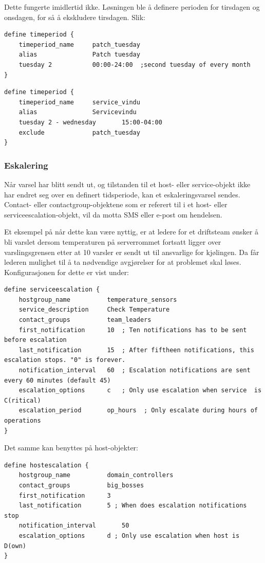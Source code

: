 Dette fungerte imidlertid ikke. Løsningen ble å definere perioden for tirsdagen og onsdagen, for så å ekskludere tirsdagen. Slik:
\begin{lstlisting}[style=example]
define timeperiod {
    timeperiod_name 	patch_tuesday
    alias           	Patch tuesday
    tuesday 2          	00:00-24:00  ;second tuesday of every month
}
\end{lstlisting}

\begin{lstlisting}[style=example]
define timeperiod {
    timeperiod_name     service_vindu
    alias				Servicevindu
    tuesday 2 - wednesday   	15:00-04:00
    exclude 			patch_tuesday
}
\end{lstlisting}

\subsubsection{Eskalering}
Når varsel har blitt sendt ut, og tilstanden til et host- eller service-objekt ikke har endret seg over en definert tidsperiode, kan et eskaleringsvarsel sendes. Contact- eller contactgroup-objektene som er referert til i et host- eller serviceescalation-objekt, vil da motta SMS eller e-post om hendelsen.

Et eksempel på når dette kan være nyttig, er at ledere for et driftsteam ønsker å bli varslet dersom temperaturen på serverrommet fortsatt ligger over varslingsgrensen etter at 10 varsler er sendt ut til ansvarlige for kjølingen. Da får lederen mulighet til å ta nødvendige avgjørelser for at problemet skal løses. Konfigurasjonen for dette er vist under:
\begin{lstlisting}[style=example]
define serviceescalation {
	hostgroup_name			temperature_sensors
	service_description		Check Temperature
	contact_groups			team_leaders
	first_notification		10	; Ten notifications has to be sent before escalation
	last_notification		15	; After fiftheen notifications, this escalation stops. "0" is forever.
	notification_interval	60 	; Escalation notifications are sent every 60 minutes (default 45)
	escalation_options		c	; Only use escalation when service  is C(ritical)
	escalation_period		op_hours  ; Only escalate during hours of operations
}
\end{lstlisting}
Det samme kan benyttes på host-objekter:
\begin{lstlisting}[style=example]
define hostescalation {
	hostgroup_name			domain_controllers
	contact_groups			big_bosses
	first_notification		3 	
	last_notification		5 ; When does escalation notifications stop
	notification_interval		50
	escalation_options		d ; Only use escalation when host is D(own)
}
\end{lstlisting}

